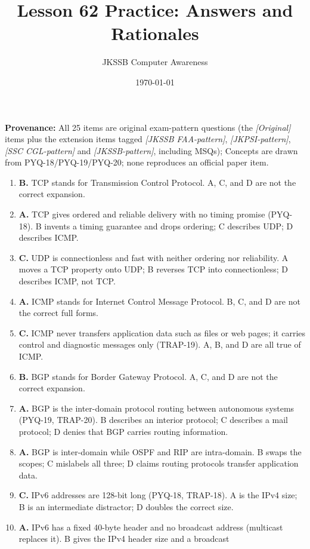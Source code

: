 \documentclass[11pt]{article}
\title{Lesson 62 Practice: Answers and Rationales}
\author{JKSSB Computer Awareness}
\date{\today}
\begin{document}
\maketitle
\noindent\textbf{Provenance:} All 25 items are original exam-pattern questions (the \textit{[Original]} items plus the extension items tagged \textit{[JKSSB FAA-pattern]}, \textit{[JKPSI-pattern]}, \textit{[SSC CGL-pattern]} and \textit{[JKSSB-pattern]}, including MSQs); Concepts are drawn from PYQ-18/PYQ-19/PYQ-20; none reproduces an official paper item.

\begin{enumerate}[label=\textbf{Q\arabic*.}, leftmargin=*]
\item \textbf{B.} TCP stands for Transmission Control Protocol. A, C, and D
  are not the correct expansion.
\item \textbf{A.} TCP gives ordered and reliable delivery with no timing
  promise (PYQ-18). B invents a timing guarantee and drops ordering; C
  describes UDP; D describes ICMP.
\item \textbf{C.} UDP is connectionless and fast with neither ordering nor
  reliability. A moves a TCP property onto UDP; B reverses TCP into
  connectionless; D describes ICMP, not TCP.
\item \textbf{A.} ICMP stands for Internet Control Message Protocol. B, C,
  and D are not the correct full forms.
\item \textbf{C.} ICMP never transfers application data such as files or web
  pages; it carries control and diagnostic messages only (TRAP-19). A, B,
  and D are all true of ICMP.
\item \textbf{B.} BGP stands for Border Gateway Protocol. A, C, and D are not
  the correct expansion.
\item \textbf{A.} BGP is the inter-domain protocol routing between autonomous
  systems (PYQ-19, TRAP-20). B describes an interior protocol; C describes a
  mail protocol; D denies that BGP carries routing information.
\item \textbf{A.} BGP is inter-domain while OSPF and RIP are intra-domain.
  B swaps the scopes; C mislabels all three; D claims routing protocols
  transfer application data.
\item \textbf{C.} IPv6 addresses are 128-bit long (PYQ-18, TRAP-18). A is the
  IPv4 size; B is an intermediate distractor; D doubles the correct size.
\item \textbf{A.} IPv6 has a fixed 40-byte header and no broadcast address
  (multicast replaces it). B gives the IPv4 header size and a broadcast

\end{enumerate}
\end{document}
